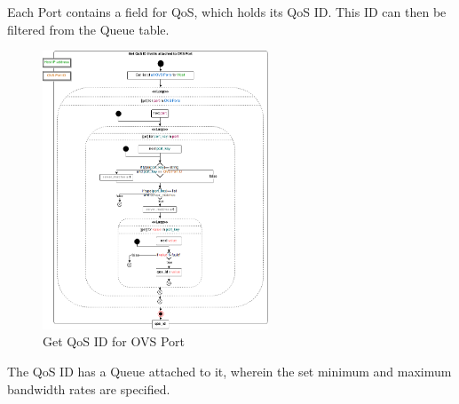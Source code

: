 Each Port contains a field for QoS, which holds its QoS ID. This ID can then be filtered from the Queue table.

\begin{figure}[H]
\centering

\includegraphics[width=0.6\textwidth]{images/implementation/cma_get_qos_id_for_ovs_port}

\caption{Get QoS ID for OVS Port}
\end{figure}

The QoS ID has a Queue attached to it, wherein the set minimum and maximum bandwidth rates are specified.

